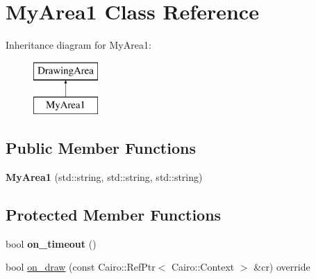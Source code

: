 \hypertarget{class_my_area1}{}\section{My\+Area1 Class Reference}
\label{class_my_area1}
Inheritance diagram for My\+Area1\+:\begin{figure}[H]
\begin{center}
\leavevmode
\includegraphics[height=2.000000cm]{class_my_area1}
\end{center}
\end{figure}
\subsection*{Public Member Functions}
\begin{DoxyCompactItemize}
\item 
\mbox{\label{class_my_area1_a1fcb3817fdd9f235bf1ac32d00a67e0a}} 
{\bfseries My\+Area1} (std\+::string, std\+::string, std\+::string)
\end{DoxyCompactItemize}
\subsection*{Protected Member Functions}
\begin{DoxyCompactItemize}
\item 
\mbox{\label{class_my_area1_ad8d17dc7c404d0b38135238117824304}} 
bool {\bfseries on\+\_\+timeout} ()
\item 
bool \mbox{\hyperlink{class_my_area1_a0419f61e4d9fc84259fa67cc0dd2a530}{on\+\_\+draw}} (const Cairo\+::\+Ref\+Ptr$<$ Cairo\+::\+Context $>$ \&cr) override
\end{DoxyCompactItemize}
